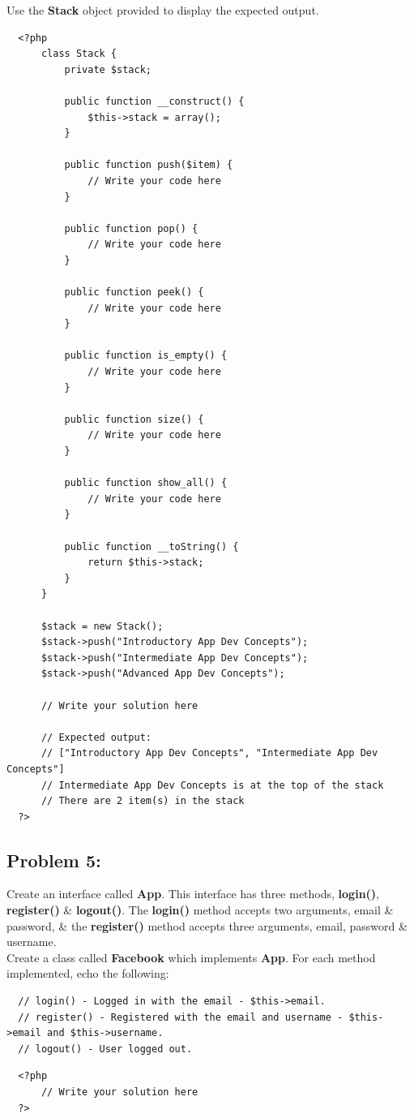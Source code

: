 \documentclass{article}
\begin{document}
Use the \textbf{Stack} object provided to display the expected output. 

\begin{verbatim}
  <?php
      class Stack {
          private $stack;

          public function __construct() {
              $this->stack = array();
          }

          public function push($item) {
              // Write your code here
          }

          public function pop() {
              // Write your code here
          }

          public function peek() {
              // Write your code here
          }

          public function is_empty() {
              // Write your code here
          }

          public function size() {
              // Write your code here
          }

          public function show_all() {
              // Write your code here
          }

          public function __toString() {
              return $this->stack;
          }
      }   
          
      $stack = new Stack();
      $stack->push("Introductory App Dev Concepts");
      $stack->push("Intermediate App Dev Concepts");
      $stack->push("Advanced App Dev Concepts");

      // Write your solution here

      // Expected output:
      // ["Introductory App Dev Concepts", "Intermediate App Dev Concepts"]
      // Intermediate App Dev Concepts is at the top of the stack
      // There are 2 item(s) in the stack
  ?>
\end{verbatim}

\subsection*{Problem 5:} 
Create an interface called \textbf{App}. This interface has three methods, \textbf{login()}, \textbf{register()} \& \textbf{logout()}. The \textbf{login()} method accepts two arguments, email \& password, \& the \textbf{register()} method accepts three arguments, email, password \& username. \\

Create a class called \textbf{Facebook} which implements \textbf{App}. For each method implemented, echo the following:
\begin{verbatim}
  // login() - Logged in with the email - $this->email.
  // register() - Registered with the email and username - $this->email and $this->username.
  // logout() - User logged out.
\end{verbatim}

\begin{verbatim}
  <?php
      // Write your solution here
  ?>
\end{verbatim}
\end{document}
